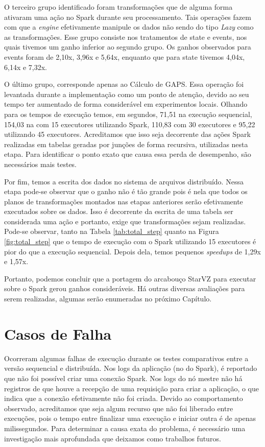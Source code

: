 O terceiro grupo identificado foram transformações que de alguma forma ativaram 
uma ação no Spark durante seu processamento. Tais operações fazem com que a 
\textit{engine} efetivamente manipule os dados \cite{ref:sparkbook} não sendo 
do tipo \textit{Lazy} como as transformações. Esse grupo consiste nos 
tratamentos de state e events, nos quais tivemos um ganho inferior ao segundo 
grupo. Os ganhos observados para events foram de 2,10x, 3,96x e 5,64x, enquanto 
que para state tivemos 4,04x, 6,14x e 7,32x.

O último grupo, corresponde apenas ao Cálculo de GAPS. Essa operação foi 
levantada durante a implementação como um ponto de atenção, devido ao seu tempo 
ter aumentado de forma considerável em experimentos locais. Olhando para os 
tempos de execução temos, em segundos, 71,51 na execução sequencial, 154,03 na 
com 15 executores utilizando Spark, 110,83 com 30 executores e 95,22 utilizando 
45 executores. Acreditamos que isso seja decorrente das ações Spark realizadas 
em tabelas geradas por junções de forma recursiva, utilizadas nesta etapa. Para 
identificar o ponto exato que causa essa perda de desempenho, são necessários 
mais testes.

Por fim, temos a escrita dos dados no sistema de arquivos distribuído. Nessa 
etapa pode-se observar que o ganho não é tão grande pois é nela que todos os 
planos de transformações montados nas etapas anteriores serão efetivamente 
executados sobre os dados. Isso é decorrente da escrita de uma tabela ser
considerada uma ação e portanto, exige que transformações sejam realizadas.
Pode-se observar, tanto na Tabela 
\ref{tab:total_step} quanto na Figura \ref{fig:total_step} que o tempo de 
execução com o Spark utilizando 15 executores é pior do que a execução 
sequencial. Depois dela, temos pequenos \textit{speedups} de 1,29x e 1,57x.

Portanto, podemos concluir que a portagem do arcabouço StarVZ para executar 
sobre o Spark gerou ganhos consideráveis. Há outras diversas avaliações para 
serem realizadas, algumas serão enumeradas no próximo Capítulo.


\section{Casos de Falha} \label{sect:failures}

Ocorreram algumas falhas de execução durante os testes comparativos entre a 
versão sequencial e distribuída. Nos logs da aplicação (no  do Spark), é reportado que não foi possível criar uma conexão Spark. Nos 
logs do nó mestre não há registros de que houve a recepção de uma requisição 
para criar a aplicação, o que indica que a conexão efetivamente não foi criada. 
Devido ao comportamento observado, acreditamos que seja algum recurso que não 
foi liberado entre execuções, pois o tempo entre finalizar uma execução e 
iniciar outra é de apenas milissegundos. Para determinar a causa exata do 
problema, é necessário uma investigação mais aprofundada que deixamos 
como trabalhos futuros.

